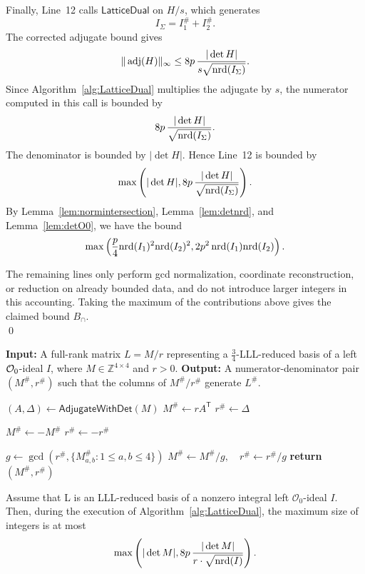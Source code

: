 Finally, Line~12 calls \(\mathsf{LatticeDual}\) on \(H/s\), which generates
\[
  I_\Sigma=I_1^\# + I_2^\#.
\]
The corrected adjugate bound gives
\[
  \|\operatorname{adj}(H)\|_\infty
  \le
  8p\,\frac{|\det H|}{s\sqrt{\mathrm{nrd}(I_\Sigma)}}.
\]
Since Algorithm~\ref{alg:LatticeDual} multiplies the adjugate by \(s\), the numerator
computed in this call is bounded by
\[
  8p\,\frac{|\det H|}{\sqrt{\mathrm{nrd}(I_\Sigma)}}.
\]
The denominator is bounded by \(|\det H|\).  Hence Line~12 is bounded by
\[
  \max\left(
    |\det H|,
    8p\,\frac{|\det H|}{\sqrt{\mathrm{nrd}(I_\Sigma)}}
  \right).
\]
By Lemma~\ref{lem:normintersection}, Lemma~\ref{lem:detnrd}, and Lemma~\ref{lem:detO0}, we have the bound
\[
    \max\left(
    \frac{p}{4}\mathrm{nrd}(I_1)^2\mathrm{nrd}(I_2)^2,
    2p^2\,\mathrm{nrd}(I_1)\mathrm{nrd}(I_2)
  \right).
\]

The remaining lines only perform gcd normalization, coordinate reconstruction, or
reduction on already bounded data, and do not introduce larger integers in this
accounting.  Taking the maximum of the contributions above gives the claimed bound
\(B_{\cap}\). \\ \qed


\begin{algorithm}
\caption{LatticeDual($M,r$)}
\label{alg:LatticeDual}
\begin{algorithmic}[1]
  \Statex \textbf{Input:} A full-rank matrix $L = M/r$ representing a $\frac34$-LLL-reduced basis of a left $\mathcal{O}_0$-ideal $I$, where $M\in\mathbb{Z}^{4\times 4}$ and $r>0$.
  \Statex \textbf{Output:} A numerator-denominator pair $(M^\#,r^\#)$
  such that the columns of $M^\#/r^\#$ generate $L^\#$.

  \State $(A,\Delta) \gets \mathsf{AdjugateWithDet}(M)$
    \Statex \hspace{\algorithmicindent} 
  \State $M^\# \gets r A^{\mathsf T}$
  \State $r^\# \gets \Delta$

    \State $M^\# \gets -M^\#$
    \State $r^\# \gets -r^\#$
  \EndIf

  \State $g \gets \gcd\!\left(r^\#,\{M^\#_{a,b}:1\leq a,b\leq4\}\right)$
  \State $M^\# \gets M^\#/g,\quad r^\# \gets r^\#/g$
  \State \textbf{return} $(M^\#,r^\#)$
\end{algorithmic}
\end{algorithm}

\begin{lemma}
\label{lem:dual-bound}
Assume that L is an LLL-reduced basis of a nonzero integral left \(\mathcal O_0\)-ideal \(I\).
Then, during the execution of Algorithm~\ref{alg:LatticeDual}, the maximum size
of integers is at most
\[
  \max\left(
    |\det M|,
    8p\,\frac{|\det M|}{r\cdot\sqrt{\mathrm{nrd}(I)}}
  \right).
\]
\end{lemma}

